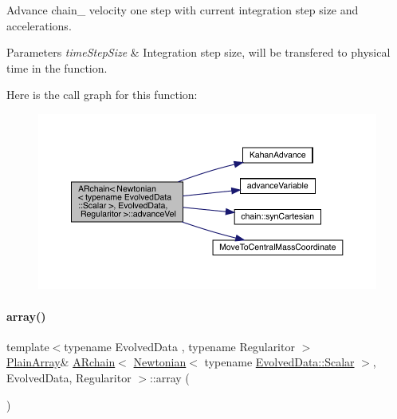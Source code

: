 Advance chain_ velocity one step with current integration step size and accelerations.
\begin{DoxyParams}{Parameters}
{\em time\+Step\+Size} & Integration step size, will be transfered to physical time in the function. \\
\hline
\end{DoxyParams}
Here is the call graph for this function\+:\nopagebreak
\begin{figure}[H]
\begin{center}
\leavevmode
\includegraphics[width=350pt]{class_a_rchain_3_01_newtonian_3_01typename_01_evolved_data_1_1_scalar_01_4_00_01_evolved_data_00_01_regularitor_01_4_ad11d21617228157e755aa334d9c621a7_cgraph}
\end{center}
\end{figure}
\mbox{\label{class_a_rchain_3_01_newtonian_3_01typename_01_evolved_data_1_1_scalar_01_4_00_01_evolved_data_00_01_regularitor_01_4_a919d200a913f75719c7240c030b9b113}} 
\paragraph{\texorpdfstring{array()}{array()}}
{\footnotesize\ttfamily template$<$typename Evolved\+Data , typename Regularitor $>$ \\
\mbox{\hyperlink{class_a_rchain_3_01_newtonian_3_01typename_01_evolved_data_1_1_scalar_01_4_00_01_evolved_data_00_01_regularitor_01_4_a8cf940df8dabb6c78662f839c2b13c9a}{Plain\+Array}}\& \mbox{\hyperlink{class_a_rchain}{A\+Rchain}}$<$ \mbox{\hyperlink{class_newtonian}{Newtonian}}$<$ typename \mbox{\hyperlink{class_a_rchain_a707e42a79e4744424a34c9007e84ee07}{Evolved\+Data\+::\+Scalar}} $>$, Evolved\+Data, Regularitor $>$\+::array (\begin{DoxyParamCaption}{ }\end{DoxyParamCaption})\hspace{0.3cm}{\ttfamily [inline]}}



